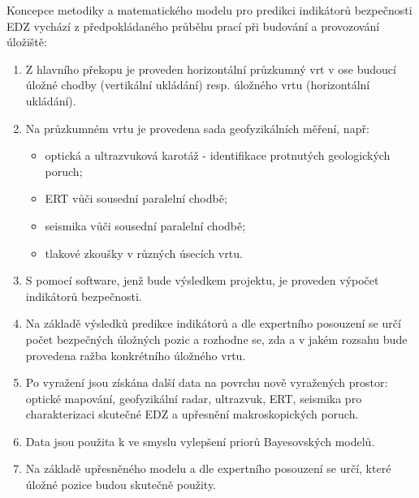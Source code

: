 \documentclass{article}
\begin{document}
Koncepce metodiky a matematického modelu pro predikci indikátorů bezpečnosti EDZ  vychází z předpokládaného průběhu prací při budování a provozování úložiště:
\begin{enumerate}
    \item Z hlavního překopu je proveden horizontální průzkumný vrt v ose budoucí úložné chodby (vertikální ukládání) resp. úložného vrtu (horizontální ukládání).
    \item Na průzkumném vrtu je provedena sada geofyzikálních měření, např:
    \begin{itemize}
        \item optická a ultrazvuková karotáž - identifikace protnutých geologických poruch;
        \item ERT vůči sousední paralelní chodbě;
        \item seismika vůči sousední paralelní chodbě;
        \item tlakové zkoušky v různých úsecích vrtu.
    \end{itemize}
    \item \label{item_model1}
    S pomocí software, jenž bude výsledkem projektu, je proveden výpočet indikátorů bezpečnosti.
    \item Na základě výsledků predikce indikátorů a dle expertního posouzení se určí počet bezpečných úložných pozic a rozhodne se, zda a v jakém rozsahu bude provedena ražba  konkrétního úložného vrtu.
    \item Po vyražení jsou získána další data na povrchu nově vyražených prostor: optické mapování, geofyzikální radar, ultrazvuk, ERT, seismika pro charakterizaci skutečné EDZ a 
          upřesnění makroskopických poruch.
    \item Data jsou použita k  ve smyslu vylepšení priorů Bayesovských modelů. 
    \item \label{item_model2}
    Na základě upřesněného modelu a dle expertního posouzení se určí, které úložné pozice budou skutečně použity.
\end{enumerate}
\end{document}
